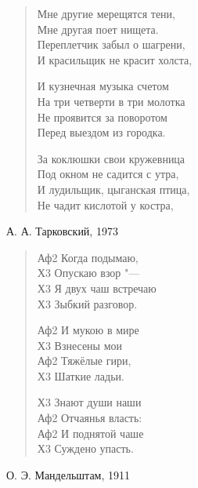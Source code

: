 \documentclass{beamer}
\begin{document}
\begin{frame}

\begin{verse}
Мне другие мерещятся тени,\\
Мне другая поет нищета.\\
Переплетчик забыл о шагрени,\\
И красильщик не красит холста,

И кузнечная музыка счетом\\
На три четверти в три молотка\\
Не проявится за поворотом\\
Перед выездом из городка.

За коклюшки свои кружевница\\
Под окном не садится с утра,\\
И лудильщик, цыганская птица,\\
Не чадит кислотой у костра,

\end{verse}

А. А. Тарковский, 1973

\end{frame}

\begin{frame}
\begin{verse}

Аф2 Когда подымаю,\\
Х3 Опускаю взор "---\\
Х3 Я двух чаш встречаю\\
Х3 Зыбкий разговор.

Аф2	И мукою в мире\\
Х3 Взнесены мои	\\
Аф2 Тяжёлые гири,\\
Х3 Шаткие ладьи.
	
Х3 Знают души наши\\
Аф2 Отчаянья власть:\\
Аф2 И поднятой чаше	\\
Х3 Суждено упасть.
\end{verse}

О. Э. Мандельштам, 1911

\end{frame}
\end{document}
